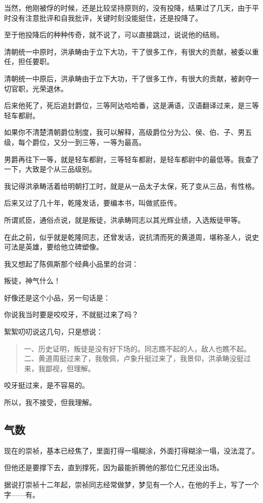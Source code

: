 \begin{multicols}{\theparacolNo}
当然，他刚被俘的时候，还是比较坚持原则的，没有投降，结果过了几天，由于平时没有注意批评和自我批评，关键时刻没能挺住，还是投降了。

至于他投降后的种种传奇，就不说了，可以直接跳过，说说他的结局。

清朝统一中原时，洪承畴由于立下大功，干了很多工作，有很大的贡献，被委以重任，担任要职。

清朝统一中原后，洪承畴由于立下大功，干了很多工作，有很大的贡献，被剥夺一切官职，光荣退休。

后来他死了，死后追封爵位，三等阿达哈哈番，这是满语，汉语翻译过来，是三等轻车都尉。

如果你不清楚清朝爵位制度，我可以解释，高级爵位分为公、侯、伯、子、男五级，每个爵位，又分一到三等，一等为最高。

男爵再往下一等，就是轻车都尉，三等轻车都尉，是轻车都尉中的最低等。我查了一下，大致是个从三品级别。

我记得洪承畴活着给明朝打工时，就是从一品太子太保，死了变从三品，有性格。

后来又过了几十年，乾隆发话，要编本书，叫做贰臣传。

所谓贰臣，通俗点说，就是叛徒，洪承畴同志以其光辉业绩，入选叛徒甲等。

在此之前，似乎就是乾隆同志，还曾发话，说抗清而死的黄道周，堪称圣人，说史可法是英雄，要给他立碑塑像。

我又想起了陈佩斯那个经典小品里的台词：

叛徒，神气什么！

好像还是这个小品，另一句话是：

你说我当时要是咬咬牙，不就挺过来了吗？

絮絮叨叨说这几句，只是想说：
{\footnotesize \begin{quote}
	一、历史证明，叛徒是没有好下场的。同志瞧不起的人，敌人也瞧不起。
	二、黄道周挺过来了，我敬佩，卢象升挺过来了，我景仰，洪承畴没挺过来，我鄙视，但理解。
\end{quote}}

咬牙挺过来，是不容易的。

所以，我不接受，但我理解。

\subsection{气数}
现在的崇祯，基本已经焦了，里面打得一塌糊涂，外面打得糊涂一塌，没法混了。

但他还是要撑下去，直到撑死，因为最能折腾他的那位仁兄还没出场。

据说打崇祯十二年起，崇祯同志经常做梦，梦见有一个人，在他的手上，写了一个字——有。


\end{multicols}
